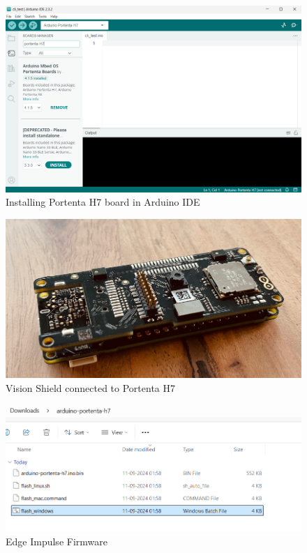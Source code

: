 \begin{figure}
	\begin{center}		\includegraphics[width=0.7\linewidth]{Images/EdgeImpulse/PortentaBoard.png}
		\caption{Installing Portenta H7 board in Arduino IDE}
		\label{BoardPortenta}
	\end{center}
\end{figure}

\begin{figure}
	\begin{center}
		\includegraphics[width=0.7\linewidth]{Images/EdgeImpulse/PortentaVisionShield.png}
		\caption{Vision Shield connected to Portenta H7}
		\label{PortentaH7VisonShield}
	\end{center}
\end{figure}

\begin{figure}
	\begin{center}
		\includegraphics[width=0.7\linewidth]{Images/EdgeImpulse/FirmwareFile.png}
		\caption{Edge Impulse Firmware}
		\label{Firmware}
	\end{center}
\end{figure}

